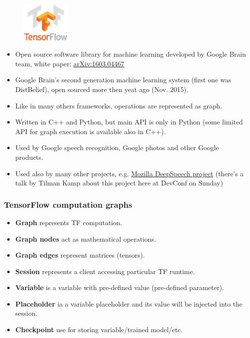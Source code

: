\documentclass[10pt,utf8]{beamer}
\begin{document}
\begin{frame}
	\begin{figure}
		\centering
		\includegraphics[height=2cm]{./img/tensorflow_logo.eps}
	\end{figure}
	\begin{itemize}	
		\item Open source software library for machine learning developed by Google Brain team, white paper: \color{blue}\href{https://arxiv.org/abs/1603.04467}{arXiv:1603.04467}\color{black}
		\pause
		\item Google Brain's second generation machine learning system (first one was DistBelief), open sourced more then yeat ago (Nov. 2015).
		\pause
		\item Like in many others frameworks, operations are represented as graph.
		\pause
		\item Written in C++ and Python, but main API is only in Python (some limited API for graph execution is available also in C++).
		\pause
		\item Used by Google speech recognition, Google photos and other Google products. 
		\pause
		\item Used also by many other projects, e.g. \color{blue} \href{https://github.com/mozilla/DeepSpeech}{Mozilla DeepSpeech project} \color{black}
		(there's a talk by Tilman Kamp about this project here at DevConf on Sunday)
	\end{itemize}
\end{frame}

\begin{frame}
	\frametitle{TensorFlow computation graphs}
	\begin{itemize}
		\item \textbf{Graph} represents TF computation.
		\pause
		\item \textbf{Graph nodes} act as mathematical operations.
		\pause
		\item \textbf{Graph edges} represent matrices (tensors).
		\pause
		\item \textbf{Session} represents a client accessing particular TF runtime.
		\pause
		\item \textbf{Variable} is a variable with pre-defined value (pre-defined parameter).
		\pause
		\item \textbf{Placeholder} ia a variable placeholder and its value will be injected into the session.
		\pause
		\item \textbf{Checkpoint} use for storing variable/trained model/etc.
	\end{itemize}
\end{frame}
\end{document}
